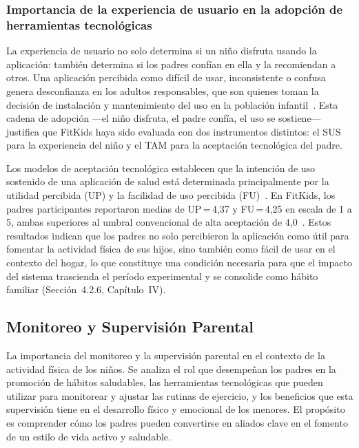 				\subsubsection{Importancia de la experiencia de usuario en la adopción de herramientas tecnológicas}
					La experiencia de usuario no solo determina si un niño disfruta usando la aplicación: también determina si los padres confían en ella y la recomiendan a otros. Una aplicación percibida como difícil de usar, inconsistente o confusa genera desconfianza en los adultos responsables, que son quienes toman la decisión de instalación y mantenimiento del uso en la población infantil~\cite{VegaDiaz2023}. Esta cadena de adopción ---el niño disfruta, el padre confía, el uso se sostiene--- justifica que FitKids haya sido evaluada con dos instrumentos distintos: el SUS para la experiencia del niño y el TAM para la aceptación tecnológica del padre.
					
					Los modelos de aceptación tecnológica establecen que la intención de uso sostenido de una aplicación de salud está determinada principalmente por la utilidad percibida (UP) y la facilidad de uso percibida (FU)~\cite{Davis1989,Venkatesh2003}. En FitKids, los padres participantes reportaron medias de UP\,=\,4,37 y FU\,=\,4,25 en escala de 1 a 5, ambas superiores al umbral convencional de alta aceptación de 4,0~\cite{Venkatesh2003}. Estos resultados indican que los padres no solo percibieron la aplicación como útil para fomentar la actividad física de sus hijos, sino también como fácil de usar en el contexto del hogar, lo que constituye una condición necesaria para que el impacto del sistema trascienda el período experimental y se consolide como hábito familiar (Sección~4.2.6, Capítulo~IV).
				
			\subsection{Monitoreo y Supervisión Parental}
				La importancia del monitoreo y la supervisión parental en el contexto de la actividad física de los niños. Se analiza el rol que desempeñan los padres en la promoción de hábitos saludables, las herramientas tecnológicas que pueden utilizar para monitorear y ajustar las rutinas de ejercicio, y los beneficios que esta supervisión tiene en el desarrollo físico y emocional de los menores. El propósito es comprender cómo los padres pueden convertirse en aliados clave en el fomento de un estilo de vida activo y saludable.


